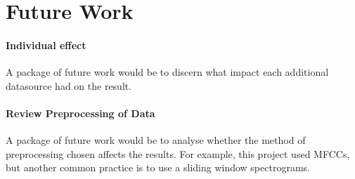 \documentclass{UoNMCHA}
\newcommand{\inlineQuote}[1]{``#1''}
\numberwithin{equation}{section}
\begin{document}







\clearpage \section{Future Work}\label{sec:futurework}
\paragraph{Individual effect}
A package of future work would be to discern what impact each additional datasource had on the result.

\paragraph{Review Preprocessing of Data}
A package of future work would be to analyse whether the method of preprocessing chosen affects the results. For example, this project used MFCCs, but another common practice is to use a sliding window spectrograms.
\end{document}
